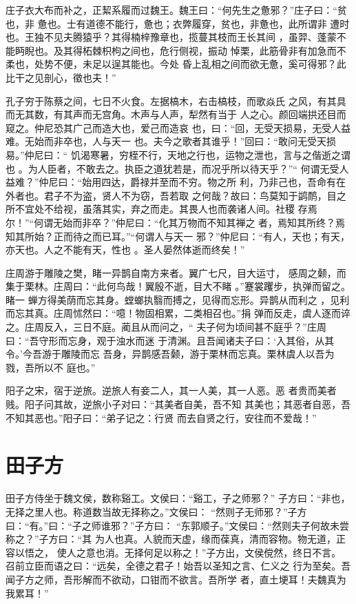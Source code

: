 \documentclass[a4paper,12pt,UTF8,twoside]{ctexbook}
\begin{document}
庄子衣大布而补之，正絜系履而过魏王。魏王曰：“何先生之惫邪？”庄子曰：“贫也，非 惫也。士有道德不能行，惫也；衣弊履穿，贫也，非惫也，此所谓非 遭时也。王独不见夫腾猿乎？其得楠梓豫章也，揽蔓其枝而王长其间 ，虽羿、蓬蒙不能眄睨也。及其得柘棘枳枸之间也，危行侧视，振动 悼栗，此筋骨非有加急而不柔也，处势不便，未足以逞其能也。今处 昏上乱相之间而欲无惫，奚可得邪？此比干之见剖心，徵也夫！”

孔子穷于陈蔡之间，七日不火食。左据槁木，右击槁枝，而歌焱氏 之风，有其具而无其数，有其声而无宫角。木声与人声，犁然有当于 人之心。颜回端拱还目而窥之。仲尼恐其广己而造大也，爱己而造哀 也，曰：“回，无受天损易，无受人益难。无始而非卒也，人与天一 也。夫今之歌者其谁乎！”回曰：“敢问无受天损易。”仲尼曰：“ 饥渴寒暑，穷桎不行，天地之行也，运物之泄也，言与之偕逝之谓也 。为人臣者，不敢去之。执臣之道犹若是，而况乎所以待天乎？”“ 何谓无受人益难？”仲尼曰：“始用四达，爵禄并至而不穷。物之所 利，乃非己也，吾命有在外者也。君子不为盗，贤人不为窃，吾若取 之何哉？故曰：鸟莫知于鹢鸸，目之 所不宜处不给视，虽落其实，弃之而走。其畏人也而袭诸人间。社稷 存焉尔！”“何谓无始而非卒？”仲尼曰：“化其万物而不知其禅之 者，焉知其所终？焉知其所始？正而待之而已耳。”“何谓人与天一 邪？”仲尼曰：“有人，天也；有天，亦天也。人之不能有天，性也 。圣人晏然体逝而终矣！”

庄周游于雕陵之樊，睹一异鹊自南方来者。翼广七尺，目大运寸， 感周之颡，而集于栗林。庄周曰：“此何鸟哉！翼殷不逝，目大不睹 。”蹇裳躩步，执弹而留之。睹一 蝉方得美荫而忘其身。螳螂执翳而搏之，见得而忘形。异鹊从而利之 ，见利而忘其真。庄周怵然曰：“噫！物固相累，二类相召也。”捐 弹而反走，虞人逐而谇之。庄周反入，三日不庭。蔺且从而问之，“ 夫子何为顷间甚不庭乎？”庄周曰：“吾守形而忘身，观于浊水而迷 于清渊。且吾闻诸夫子曰：‘入其俗，从其令。’今吾游于雕陵而忘 吾身，异鹊感吾颡，游于栗林而忘真。栗林虞人以吾为戮，吾所以不 庭也。”

阳子之宋，宿于逆旅。逆旅人有妾二人，其一人美，其一人恶。恶 者贵而美者贱。阳子问其故，逆旅小子对曰：“其美者自美，吾不知 其美也；其恶者自恶，吾不知其恶也。”阳子曰：“弟子记之：行贤 而去自贤之行，安往而不爱哉！”
\section{田子方}

田子方侍坐于魏文侯，数称谿工。文侯曰：“谿工，子之师邪？” 子方曰：“非也，无择之里人也。称道数当故无择称之。”文侯曰： “然则子无师邪？”子方曰：“有。”曰：“子之师谁邪？”子方曰： “东郭顺子。”文侯曰：“然则夫子何故未尝称之？”子方曰：“其 为人也真。人貌而天虚，缘而葆真，清而容物。物无道，正容以悟之， 使人之意也消。无择何足以称之！”子方出，文侯傥然，终日不言。 召前立臣而语之曰：“远矣，全德之君子！始吾以圣知之言、仁义之 行为至矣。吾闻子方之师，吾形解而不欲动，口钳而不欲言。吾所学 者，直土埂耳！夫魏真为我累耳！”
\end{document}
